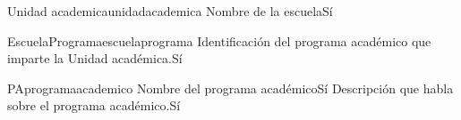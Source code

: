 \begin{cdtEntidad}{Unidad academica}{unidadacademica}
	{Nombre de la escuela}{Sí}
\end{cdtEntidad}
\begin{cdtEntidad}{EscuelaPrograma}{escuelaprograma}
	{Identificación del programa académico que imparte la Unidad académica.}{Sí}
\end{cdtEntidad}
\begin{cdtEntidad}{PA}{programaacademico}
	{Nombre del programa académico}{Sí}
	{Descripción que habla sobre el programa académico.}{Sí}
\end{cdtEntidad}

